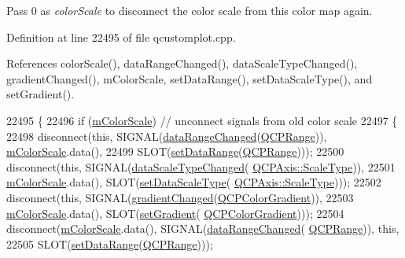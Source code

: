 Pass 0 as {\itshape color\+Scale} to disconnect the color scale from this color map again. 

Definition at line 22495 of file qcustomplot.\+cpp.



References color\+Scale(), data\+Range\+Changed(), data\+Scale\+Type\+Changed(), gradient\+Changed(), m\+Color\+Scale, set\+Data\+Range(), set\+Data\+Scale\+Type(), and set\+Gradient().


\begin{DoxyCode}
22495                                                          \{
22496   \textcolor{keywordflow}{if} (\hyperlink{class_q_c_p_color_map_a95b4100bacc3387652c988b071ec9db7}{mColorScale}) \textcolor{comment}{// unconnect signals from old color scale}
22497   \{
22498     disconnect(\textcolor{keyword}{this}, SIGNAL(\hyperlink{class_q_c_p_color_map_a482980f2335d09cfb36dd95ba9663197}{dataRangeChanged}(\hyperlink{class_q_c_p_range}{QCPRange})), 
      \hyperlink{class_q_c_p_color_map_a95b4100bacc3387652c988b071ec9db7}{mColorScale}.data(),
22499                SLOT(\hyperlink{class_q_c_p_color_map_a980b42837821159786a85b4b7dcb8774}{setDataRange}(\hyperlink{class_q_c_p_range}{QCPRange})));
22500     disconnect(\textcolor{keyword}{this}, SIGNAL(\hyperlink{class_q_c_p_color_map_a978d5d5c9f68cffef8c902b855c04490}{dataScaleTypeChanged}(
      \hyperlink{class_q_c_p_axis_a36d8e8658dbaa179bf2aeb973db2d6f0}{QCPAxis::ScaleType})),
22501                \hyperlink{class_q_c_p_color_map_a95b4100bacc3387652c988b071ec9db7}{mColorScale}.data(), SLOT(\hyperlink{class_q_c_p_color_map_a9d20aa08e3c1f20f22908c45b9c06511}{setDataScaleType}(
      \hyperlink{class_q_c_p_axis_a36d8e8658dbaa179bf2aeb973db2d6f0}{QCPAxis::ScaleType})));
22502     disconnect(\textcolor{keyword}{this}, SIGNAL(\hyperlink{class_q_c_p_color_map_abf4797f86e422ac6e0f732c4ff1a4d49}{gradientChanged}(\hyperlink{class_q_c_p_color_gradient}{QCPColorGradient})),
22503                \hyperlink{class_q_c_p_color_map_a95b4100bacc3387652c988b071ec9db7}{mColorScale}.data(), SLOT(\hyperlink{class_q_c_p_color_map_a7313c78360471cead3576341a2c50377}{setGradient}(
      \hyperlink{class_q_c_p_color_gradient}{QCPColorGradient})));
22504     disconnect(\hyperlink{class_q_c_p_color_map_a95b4100bacc3387652c988b071ec9db7}{mColorScale}.data(), SIGNAL(\hyperlink{class_q_c_p_color_map_a482980f2335d09cfb36dd95ba9663197}{dataRangeChanged}(
      \hyperlink{class_q_c_p_range}{QCPRange})), \textcolor{keyword}{this},
22505                SLOT(\hyperlink{class_q_c_p_color_map_a980b42837821159786a85b4b7dcb8774}{setDataRange}(\hyperlink{class_q_c_p_range}{QCPRange})));

\end{DoxyCode}
